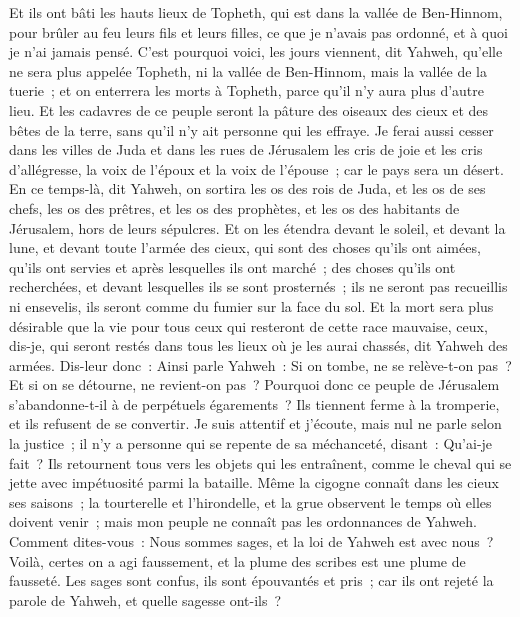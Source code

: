\begin{multicols}{2}
Et ils ont bâti les hauts lieux de Topheth, qui est dans la vallée de Ben-Hinnom, pour brûler au feu leurs fils et leurs filles, ce que je n'avais pas ordonné, et à quoi je n'ai jamais pensé.
C'est pourquoi voici, les jours viennent, dit Yahweh, qu'elle ne sera plus appelée Topheth, ni la vallée de Ben-Hinnom, mais la vallée de la tuerie~; et on enterrera les morts à Topheth, parce qu'il n'y aura plus d'autre lieu.
Et les cadavres de ce peuple seront la pâture des oiseaux des cieux et des bêtes de la terre, sans qu'il n'y ait personne qui les effraye.
Je ferai aussi cesser dans les villes de Juda et dans les rues de Jérusalem les cris de joie et les cris d'allégresse, la voix de l'époux et la voix de l'épouse~; car le pays sera un désert.
\VerseOne{}En ce temps-là, dit Yahweh, on sortira les os des rois de Juda, et les os de ses chefs, les os des prêtres, et les os des prophètes, et les os des habitants de Jérusalem, hors de leurs sépulcres.
Et on les étendra devant le soleil, et devant la lune, et devant toute l'armée des cieux, qui sont des choses qu'ils ont aimées, qu'ils ont servies et après lesquelles ils ont marché~; des choses qu'ils ont recherchées, et devant lesquelles ils se sont prosternés~; ils ne seront pas recueillis ni ensevelis, ils seront comme du fumier sur la face du sol.
Et la mort sera plus désirable que la vie pour tous ceux qui resteront de cette race mauvaise, ceux, dis-je, qui seront restés dans tous les lieux où je les aurai chassés, dit Yahweh des armées.
Dis-leur donc~: Ainsi parle Yahweh~: Si on tombe, ne se relève-t-on pas~? Et si on se détourne, ne revient-on pas~?
Pourquoi donc ce peuple de Jérusalem s'abandonne-t-il à de perpétuels égarements~? Ils tiennent ferme à la tromperie, et ils refusent de se convertir.
Je suis attentif et j'écoute, mais nul ne parle selon la justice~; il n'y a personne qui se repente de sa méchanceté, disant~: Qu'ai-je fait~? Ils retournent tous vers les objets qui les entraînent, comme le cheval qui se jette avec impétuosité parmi la bataille.
Même la cigogne connaît dans les cieux ses saisons~; la tourterelle et l'hirondelle, et la grue observent le temps où elles doivent venir~; mais mon peuple ne connaît pas les ordonnances de Yahweh.
Comment dites-vous~: Nous sommes sages, et la loi de Yahweh est avec nous~? Voilà, certes on a agi faussement, et la plume des scribes est une plume de fausseté.
Les sages sont confus, ils sont épouvantés et pris~; car ils ont rejeté la parole de Yahweh, et quelle sagesse ont-ils~?

\end{multicols}
